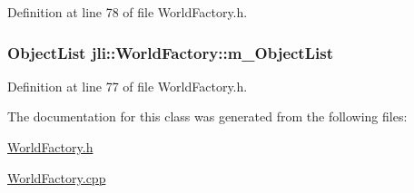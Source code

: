 Definition at line 78 of file World\+Factory.\+h.

\hypertarget{classjli_1_1_world_factory_ac1a42314be66db6555d7723a35d2cdbc}{
\subsubsection[{m\+\_\+\+Object\+List}]{\setlength{\rightskip}{0pt plus 5cm}Object\+List jli\+::\+World\+Factory\+::m\+\_\+\+Object\+List}}\label{classjli_1_1_world_factory_ac1a42314be66db6555d7723a35d2cdbc}


Definition at line 77 of file World\+Factory.\+h.



The documentation for this class was generated from the following files\+:\begin{DoxyCompactItemize}
\item 
\hyperlink{_world_factory_8h}{World\+Factory.\+h}\item 
\hyperlink{_world_factory_8cpp}{World\+Factory.\+cpp}\end{DoxyCompactItemize}
